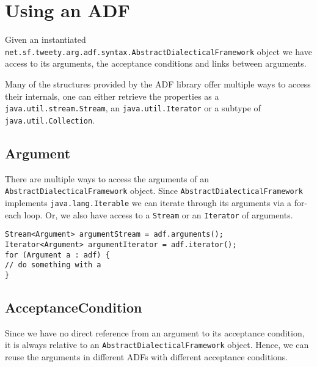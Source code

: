 \documentclass{scrartcl}[a4paper,10pt]
\newcommand{\jlstinline}[1]{\lstinline[style=java]|#1|}
\begin{document}
\section{Using an ADF}

Given an instantiated \jlstinline{net.sf.tweety.arg.adf.syntax.AbstractDialecticalFramework} object we have access to its arguments, the acceptance conditions and links between arguments.

Many of the structures provided by the ADF library offer multiple ways to access their internals, one can either retrieve the properties as a \jlstinline{java.util.stream.Stream}, an \jlstinline{java.util.Iterator} or a subtype of \jlstinline{java.util.Collection}.


\subsection{Argument}

There are multiple ways to access the arguments of an \jlstinline{AbstractDialecticalFramework} object. Since \jlstinline{AbstractDialecticalFramework} implements \jlstinline{java.lang.Iterable} we can iterate through its arguments via a for-each loop. Or, we also have access to a \jlstinline{Stream} or an \jlstinline{Iterator} of arguments.

\begin{lstlisting}[style=java,caption=Access the arguments.]
Stream<Argument> argumentStream = adf.arguments();
Iterator<Argument> argumentIterator = adf.iterator();
for (Argument a : adf) {
// do something with a
}
\end{lstlisting}

\subsection{AcceptanceCondition}

Since we have no direct reference from an argument to its acceptance condition, it is always relative to an \jlstinline{AbstractDialecticalFramework} object. Hence, we can reuse the arguments in different ADFs with different acceptance conditions. 
\end{document}
